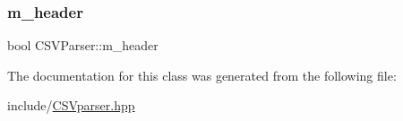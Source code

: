 \mbox{\label{class_c_s_v_parser_a4dcb7bb113b65d0abf816dd899395545}} 
\subsubsection{\texorpdfstring{m\+\_\+header}{m\_header}}
{\footnotesize\ttfamily bool C\+S\+V\+Parser\+::m\+\_\+header\hspace{0.3cm}{\ttfamily [private]}}



The documentation for this class was generated from the following file\+:\begin{DoxyCompactItemize}
\item 
include/\hyperlink{_c_s_vparser_8hpp}{C\+S\+Vparser.\+hpp}\end{DoxyCompactItemize}
